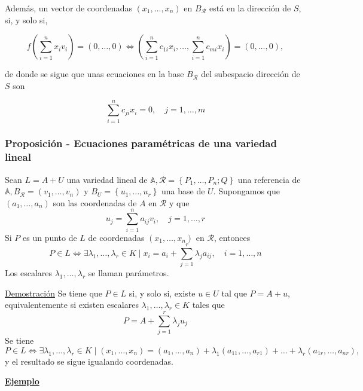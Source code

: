\documentclass[12pt, a4paper, ones, notitlepage, openany,titlepage]{article}
\newcommand{\demostracion}{\noindent\underline{Demostración}}
\newcommand{\ejemplo}{\noindent\underline{\textbf{Ejemplo}}}
\begin{document}
Además, un vector de coordenadas $\left(x_{1}, \ldots, x_{n}\right)$ en $B_{\mathcal{R}}$ está en la dirección de $S$, si, y solo si,

$$
f\left(\sum_{i=1}^{n} x_{i} v_{i}\right)=(0, \ldots, 0) \Longleftrightarrow\left(\sum_{i=1}^{n} c_{1 i} x_{i}, \ldots, \sum_{i=1}^{n} c_{m i} x_{i}\right)=(0, \ldots, 0),
$$

de donde se sigue que unas ecuaciones en la base $B_{\mathcal{R}}$ del subespacio dirección de $S$ son

$$
\sum_{i=1}^{n} c_{j i} x_{i}=0, \quad j=1, \ldots, m
$$

\subsubsection{Proposición - Ecuaciones paramétricas de una variedad lineal}
Sean $L=A+U$ una variedad lineal de $\mathbb{A}, \mathcal{R}=\left\{P_{1}, \ldots, P_{n} ; Q\right\}$ una referencia de $\mathbb{A}, B_{\mathcal{R}}=\left(v_{1}, \ldots, v_{n}\right)$ y $B_{U}=\left\{u_{1}, \ldots, u_{r}\right\}$ una base de $U$. Supongamos que $\left(a_{1}, \ldots, a_{n}\right)$ son las coordenadas de $A$ en $\mathcal{R}$ y que
$$
u_{j}=\sum_{i=1}^{n} a_{i j} v_{i}, \quad j=1, \ldots, r
$$
\noindent Si $P$ es un punto de $L$ de coordenadas $\left(x_{1}, \ldots, x_{n}\right)$ en $\mathcal{R}$, entonces
$$
P \in L \Longleftrightarrow \exists \lambda_{1}, \ldots, \lambda_{r} \in K \mid x_{i}=a_{i}+\sum_{j=1}^{r} \lambda_{j} a_{i j}, \quad i=1, \ldots, n
$$
\noindent Los escalares $\lambda_{1}, \ldots, \lambda_{r}$ se llaman parámetros.

\demostracion 
Se tiene que $P \in L$ si, y solo si, existe $u \in U$ tal que $P=A+u$, equivalentemente si existen escalares $\lambda_{1}, \ldots, \lambda_{r} \in K$ tales que
$$
P=A+\sum_{j=1}^{r} \lambda_{j} u_{j}
$$
\noindent Se tiene
$$
P \in L \Longleftrightarrow \exists \lambda_{1}, \ldots, \lambda_{r} \in K \mid\left(x_{1}, \ldots, x_{n}\right)=\left(a_{1}, \ldots, a_{n}\right)+\lambda_{1}\left(a_{11}, \ldots, a_{r 1}\right)+\ldots+\lambda_{r}\left(a_{1 r}, \ldots, a_{n r}\right),
$$
y el resultado se sigue igualando coordenadas.

\ejemplo
\end{document}

